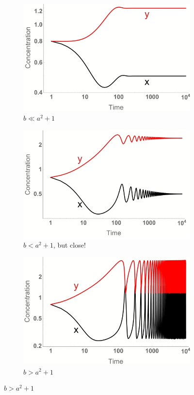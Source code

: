 \documentclass[]{article}
\begin{document}
\begin{figure}[H]
	\caption{Brusselator Stability}\label{fig:BrusselatorStability}
	
	\begin{subfigure}[b]{0.3\textwidth}
		\centering
		\caption{ $b\ll a^2+1$}\label{fig:BrusselatorSteadyState1} 
		\includegraphics[width=\textwidth]{BrusselatorSteadyState1}
	\end{subfigure}
	\begin{subfigure}[b]{0.3\textwidth}
		\centering
		\caption{$b<a^2+1$, but close!}\label{fig:BrusselatorSteadyState2} 
		\includegraphics[width=\textwidth]{BrusselatorSteadyState2}
	\end{subfigure}
	\begin{subfigure}[b]{0.3\textwidth}
	\centering
	\caption{$b>a^2+1$}\label{fig:BrusselatorChaos} 
	\includegraphics[width=\textwidth]{BrusselatorChaos}

\end{subfigure}
\end{figure}
\end{document}
